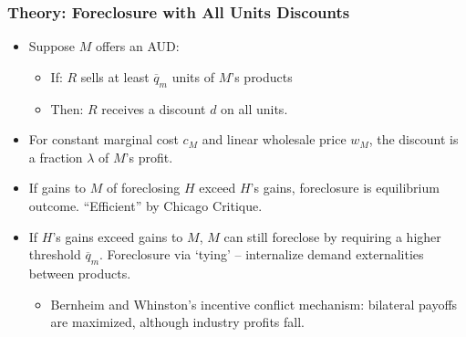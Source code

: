 \begin{frame}
\frametitle{Theory: Foreclosure with All Units Discounts}
\begin{itemize}
\item Suppose $M$ offers an AUD:
	\begin{itemize}
	\item If: $R$ sells at least $\overline{q}_m$ units of $M$'s products 
	\item Then: $R$ receives a discount $d$ on all units.
	\end{itemize}
\item For constant marginal cost $c_M$ and linear wholesale price $w_M$, the discount is a fraction $\lambda$ of $M$'s profit.
	\item If gains to $M$ of foreclosing $H$ exceed $H$'s gains, foreclosure is equilibrium outcome. ``Efficient'' by Chicago Critique.
	\item If $H$'s gains exceed gains to $M$, $M$ can still foreclose by requiring a higher threshold $\overline{q}_m$. Foreclosure via `tying' -- internalize demand externalities between products.
	\begin{itemize}
	\item Bernheim and Whinston's incentive conflict mechanism: bilateral payoffs are maximized, although industry profits fall.
	\end{itemize}
\end{itemize}
\hyperlink{supplemental}{}
\end{frame}

